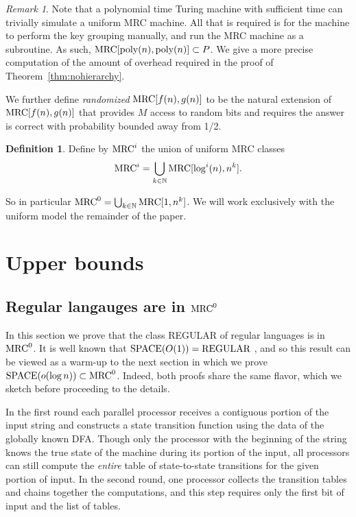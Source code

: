 \documentclass[11pt]{article}
\theoremstyle{definition}
\newtheorem{defn}{Definition}
\theoremstyle{remark}
\newtheorem{remark}{Remark}
\newcommand{\N}{\mathbb{N}}
\newcommand{\mrc}{\textup{MRC}}
\begin{document}
\begin{remark}\label{remark:timebound} 
Note that a polynomial time Turing machine with sufficient time can trivially
simulate a uniform MRC machine. All that is required is for the machine to
perform the key grouping manually, and run the MRC machine as a subroutine. As
such, $\mrc[\text{poly}(n), \text{poly}(n)] \subset P$. We give a more precise
computation of the amount of overhead required in the proof of
Theorem~\ref{thm:nohierarchy}.
\end{remark}

We further define \emph{randomized} $\mrc[f(n), g(n)]$ to be the natural
extension of $\mrc[f(n), g(n)]$ that provides $M$ access to random bits and
requires the answer is correct with probability bounded away from 1/2.

\begin{defn}
Define by $\mrc^i$ the union of uniform MRC classes
\[
   \mrc^i = \bigcup_{k\in\N}\mrc[\log^i(n),n^k].
\] 
\end{defn} 

So in particular $\mrc^0=\bigcup_{k\in\N}\text{MRC}[1,n^k]$. We will work
exclusively with the uniform model the remainder of the paper.

\section{Upper bounds}
\subsection{Regular langauges are in $\mrc^0$} 

In this section we prove that the class REGULAR of regular languages is in
$\mrc^0$. It is well known that $\textup{SPACE}(O(1)) = \textup{REGULAR}$
\cite{Shepherdson59}, and so this result can be viewed as a warm-up to the next
section in which we prove $\textup{SPACE}(o(\log n)) \subset \mrc^0$. Indeed,
both proofs share the same flavor, which we sketch before proceeding to the
details.

In the first round each parallel processor receives a contiguous portion of the
input string and constructs a state transition function using the data of the
globally known DFA. Though only the processor with the beginning of the string
knows the true state of the machine during its portion of the input, all
processors can still compute the \emph{entire} table of state-to-state
transitions for the given portion of input. In the second round, one processor
collects the transition tables and chains together the computations, and this
step requires only the first bit of input and the list of tables. 
\end{document}
